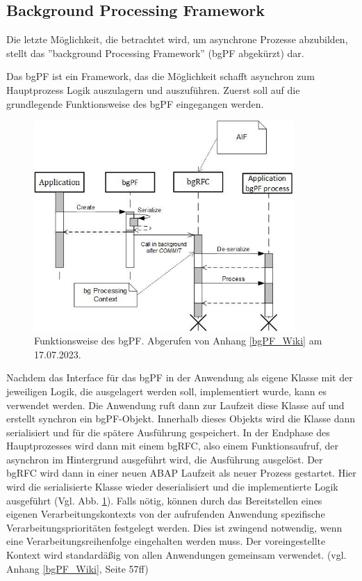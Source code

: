 \subsection{Background Processing Framework}

Die letzte Möglichkeit, die betrachtet wird, um asynchrone Prozesse abzubilden, stellt das ''background Processing Framework'' (bgPF abgekürzt) dar.

Das bgPF ist ein Framework, das die Möglichkeit schafft asynchron zum Hauptprozess Logik auszulagern und auszuführen. Zuerst soll auf die grundlegende Funktionsweise des bgPF eingegangen werden.

\begin{figure}[H]
 \centering
 \includegraphics[height=8cm]{Bilder/bgPF_Schema.png}
 \caption[Funktionsweise des bgPF]{Funktionsweise des bgPF. Abgerufen von Anhang \ref{bgPF_Wiki} am 17.07.2023.}
 \label{fig:iso_norm_bgPF}
\end{figure}

Nachdem das Interface für das bgPF in der Anwendung als eigene Klasse mit der jeweiligen Logik, die ausgelagert werden soll, implementiert wurde, kann es verwendet werden. Die Anwendung ruft dann zur Laufzeit diese Klasse auf und erstellt synchron ein bgPF-Objekt. Innerhalb dieses Objekts wird die Klasse dann serialisiert und für die spätere Ausführung gespeichert. In der Endphase des Hauptprozesses wird dann mit einem bgRFC, also einem Funktionsaufruf, der asynchron im Hintergrund ausgeführt wird, die Ausführung ausgelöst. Der bgRFC wird dann in einer neuen ABAP Laufzeit als neuer Prozess gestartet. Hier wird die serialisierte Klasse wieder deserialisiert und die implementierte Logik ausgeführt (Vgl. Abb. \ref{fig:iso_norm_bgPF}). Falls nötig, können durch das Bereitstellen eines eigenen Verarbeitungskontexts von der aufrufenden Anwendung spezifische Verarbeitungsprioritäten festgelegt werden. Dies ist zwingend notwendig, wenn eine Verarbeitungsreihenfolge eingehalten werden muss. Der voreingestellte Kontext wird standardä{\ss}ig von allen Anwendungen gemeinsam verwendet. (vgl. Anhang \ref{bgPF_Wiki}, Seite 57ff)

